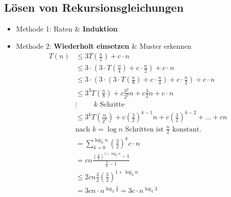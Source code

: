 \subsection{Lösen von Rekursionsgleichungen}
\begin{itemize}
\item   Methode 1: Raten \& \textbf{Induktion}
\item   Methode 2: \textbf{Wiederholt einsetzen} \& Muster erkennen
        \begin{align*}
         T(n)   &\leq 3 T\left(\frac{n}{2}\right) + c \cdot n \\
                &\leq 3 \cdot \left(3 \cdot T\left(\frac{n}{4}\right) + c \cdot \frac{n}{2}\right) + c \cdot n \\
                &\leq 3 \cdot \left(3 \cdot  \left(3 \cdot T\left(\frac{n}{8}\right) + c \cdot \frac{n}{4}\right) + c \cdot \frac{n}{2}\right) + c \cdot n\\
                &\leq 3^3 T\left(\frac{n}{8}\right) + c \frac{3^2}{2^2}n + c \frac{3}{2}n + c \cdot n\\
                &\vdots \hspace{1cm}\text{$k$ Schritte}\\
                &\leq 3^k T\left(\frac{n}{2^k}\right) + c \left(\frac{3}{2}\right)^{k-1}n + c\left(\frac{3}{2}\right)^{k-2} + ... + cn\\
                & \text{nach $k = \log n$ Schritten ist $\frac{n}{2}$ konstant.}\\
                &= \sum\limits_{k = 0}^{\log_2 n} \left(\frac{3}{2}\right)^k c \cdot n\\
                &= cn \frac{\left(\frac{3}{2}\right)^{1 + \log_2 n} - 1}{\frac{3}{2} - 1} \tag{geometrische Reihe}\\
                &\leq 2 cn \frac{3}{2} \left(\frac{3}{2}\right)^{1 + \log_2 n}\\
                &= 3 cn \cdot n^{\log_2 \frac{3}{2}} = 3 c \cdot n^{\log_2 3}
        \end{align*}

\end{itemize}
